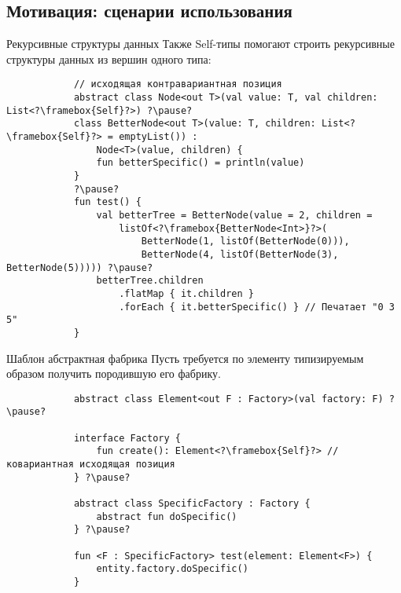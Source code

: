 \documentclass[aspectratio=169,usenames,dvipsnames]{beamer}
\begin{document}
    \subsection{Мотивация: сценарии использования}

    \begin{frame}[fragile]{Рекурсивные структуры данных}
        Также Self-типы помогают строить рекурсивные структуры данных из вершин одного типа:
        \begin{verbatim}
            // исходящая контравариантная позиция
            abstract class Node<out T>(val value: T, val children: List<?\framebox{Self}?>) ?\pause?
            class BetterNode<out T>(value: T, children: List<?\framebox{Self}?> = emptyList()) :
                Node<T>(value, children) {
                fun betterSpecific() = println(value)
            }
            ?\pause?
            fun test() {
                val betterTree = BetterNode(value = 2, children =
                    listOf<?\framebox{BetterNode<Int>}?>(
                        BetterNode(1, listOf(BetterNode(0))),
                        BetterNode(4, listOf(BetterNode(3), BetterNode(5))))) ?\pause?
                betterTree.children
                    .flatMap { it.children }
                    .forEach { it.betterSpecific() } // Печатает "0 3 5"
            }
        \end{verbatim}
    \end{frame}

    \begin{frame}[fragile]{Шаблон абстрактная фабрика}
        Пусть требуется по элементу типизируемым образом получить породившую его фабрику.

        \begin{verbatim}
            abstract class Element<out F : Factory>(val factory: F) ?\pause?

            interface Factory {
                fun create(): Element<?\framebox{Self}?> // ковариантная исходящая позиция
            } ?\pause?

            abstract class SpecificFactory : Factory {
                abstract fun doSpecific()
            } ?\pause?

            fun <F : SpecificFactory> test(element: Element<F>) {
                entity.factory.doSpecific()
            }
        \end{verbatim}
    \end{frame}
\end{document}
